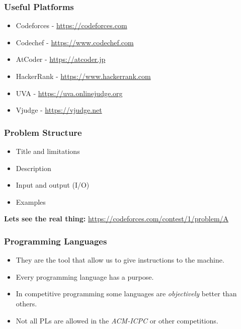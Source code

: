 \documentclass{beamer}
\begin{document}
\begin{frame}
	\frametitle{Useful Platforms}

	\begin{itemize}
		\item Codeforces - \url{https://codeforces.com}
		\item Codechef - \url{https://www.codechef.com}
		\item AtCoder - \url{https://atcoder.jp}
		\item HackerRank - \url{https://www.hackerrank.com}
		\item UVA - \url{https://uva.onlinejudge.org}
		\item Vjudge - \url{https://vjudge.net}
	\end{itemize}
\end{frame}

\begin{frame}
	\frametitle{Problem Structure}

	\begin{itemize}
		\item Title and limitations
		\item Description
		\item Input and output (I/O)
		\item Examples
	\end{itemize}

	\textbf{Lets see the real thing:}
	\url{https://codeforces.com/contest/1/problem/A}
\end{frame}

\begin{frame}
	\frametitle{Programming Languages}

	\begin{itemize}
		\item They are the tool that allow us to give instructions to the machine.
		\item Every programming language has a purpose.
		\item In competitive programming some languages are \textit{objectively} better than others.
		\item Not all PLs are allowed in the \textit{ACM-ICPC} or other competitions.
	\end{itemize}
\end{frame}
\end{document}

